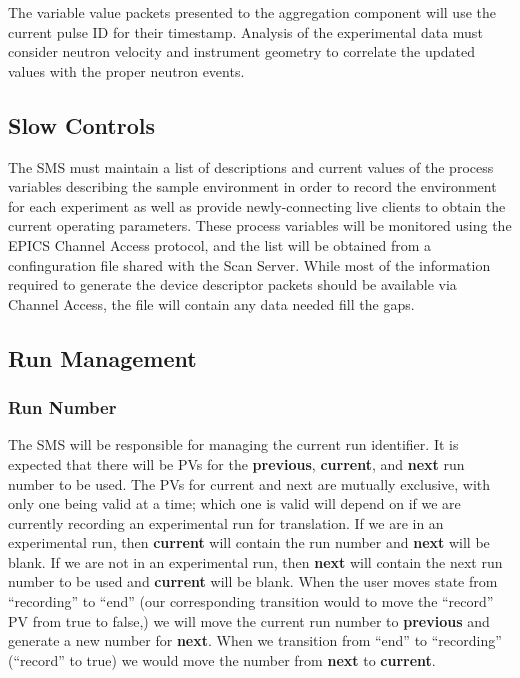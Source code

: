 The variable value packets presented to the aggregation component will
use the current pulse ID for their timestamp. Analysis of the experimental
data must consider neutron velocity and instrument geometry to correlate the
updated values with the proper neutron events.


\subsection{Slow Controls}

The SMS must maintain a list of descriptions and current values of the process
variables describing the sample environment in order to record the environment
for each experiment as well as provide newly-connecting live clients to obtain
the current operating parameters. These process variables will be monitored
using the EPICS Channel Access protocol, and the list will be obtained from a
confinguration file shared with the Scan Server. While most of the information
required to generate the device descriptor packets should be available
via Channel Access, the file will contain any data needed fill the gaps.


\subsection{Run Management}

\subsubsection{Run Number}

The SMS will be responsible for managing the current run identifier. It is
expected that there will be PVs for the {\bf previous}, {\bf current}, and {\bf
next} run number to be used. The PVs for current and next are mutually
exclusive, with only one being valid at a time; which one is valid will depend
on if we are currently recording an experimental run for translation. If we are
in an experimental run, then {\bf current} will contain the run number and {\bf
next} will be blank. If we are not in an experimental run, then {\bf next} will
contain the next run number to be used and {\bf current} will be blank. When
the user moves state from ``recording'' to ``end'' (our corresponding
transition would to move the ``record'' PV from true to false,) we will move
the current run number to {\bf previous} and generate a new number for {\bf
next}. When we transition from ``end'' to ``recording'' (``record'' to true) we
would move the number from {\bf next} to {\bf current}.

